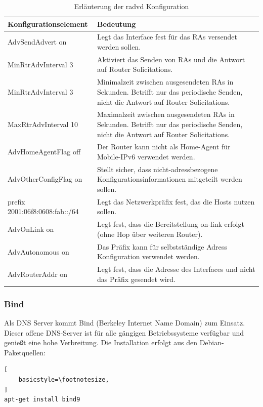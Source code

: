 \begin{table}
	\centering
		\begin{tabular}{lp{9cm}}
			Konfigurationselement & Bedeutung \\ \hline
			AdvSendAdvert on & Legt das Interface fest für das RAs versendet werden sollen. \\
			MinRtrAdvInterval 3 & Aktiviert das Senden von RAs und die Antwort auf Router Solicitations. \\
			MinRtrAdvInterval 3 & Minimalzeit zwischen ausgesendeten RAs in Sekunden. Betrifft nur das periodische Senden, nicht die Antwort auf Router Solicitations. \\
			MaxRtrAdvInterval 10 & Maximalzeit zwischen ausgesendeten RAs in Sekunden. Betrifft nur das periodische Senden, nicht die Antwort auf Router Solicitations. \\
			AdvHomeAgentFlag off & Der Router kann nicht als Home-Agent für Mobile-IPv6 verwendet werden. \\
			AdvOtherConfigFlag on & Stellt sicher, dass nicht-adressbezogene Konfigurationsinformationen mitgeteilt werden sollen. \\
			prefix 2001:06f8:0608:fab::/64 & Legt das Netzwerkpräfix fest, das die Hosts nutzen sollen. \\
			AdvOnLink on & Legt fest, dass die Bereitstellung on-link erfolgt (ohne Hop über weiteren Router). \\
			AdvAutonomous on & Das Präfix kann für selbstständige Adress Konfiguration verwendet werden. \\
			AdvRouterAddr on & Legt fest, dass die Adresse des Interfaces und nicht das Präfix gesendet wird.  \\
		\end{tabular}
	\caption{Erläuterung der radvd Konfiguration}
	\label{tab:radvdConfig}
\end{table}
\FloatBarrier
\subsubsection*{Bind}
Als DNS Server kommt Bind (Berkeley Internet Name Domain) zum Einsatz. Dieser offene DNS-Server ist für alle gängigen Betriebssysteme verfügbar und genießt eine hohe Verbreitung. Die Installation erfolgt aus den Debian-Paketquellen:
\lstset{language=bash}
\begin{lstlisting}[
	basicstyle=\footnotesize,
]
apt-get install bind9
\end{lstlisting}

